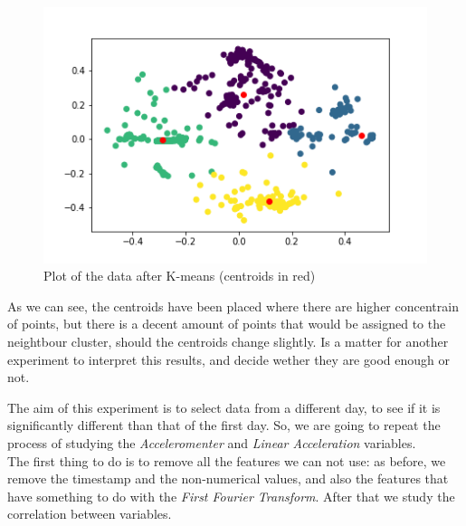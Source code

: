 \documentclass[idxtotoc,hyperref,openany]{labbook} %
\begin{document}
\begin{figure}[h]
\includegraphics[width=0.9\linewidth]{2710/KMeans_Plot_Gyroscope.png}
\setlength\belowcaptionskip{-10pt}
\caption{Plot of the data after K-means (centroids in red)}
\label{K-Means Gyroscope}
\end{figure}

As we can see, the centroids have been placed where there are higher concentrain of points, but there is a decent amount of points that would be assigned to the neightbour cluster, should the centroids change slightly. Is a matter for another experiment to interpret this results, and decide wether they are good enough or not.



The aim of this experiment is to select data from a different day, to see if it is significantly different than that of the first day. So, we are going to repeat the process of studying the \textit{Acceleromenter} and \textit{Linear Acceleration} variables.
\\

The first thing to do is to remove all the features we can not use: as before, we remove the timestamp and the non-numerical values, and also the features that have something to do with the \textit{First Fourier Transform}. After that we study the correlation between variables.
\end{document}
